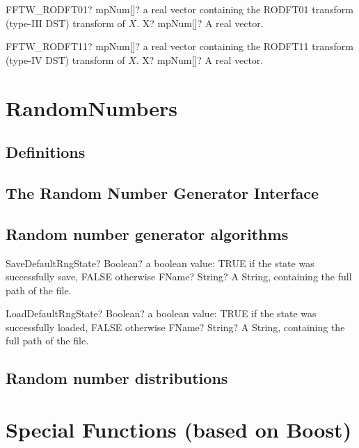 \documentclass[12pt,a4paper,openany]{book}
\begin{document}
\begin{mpFunctionsExtract}
\mpFunctionOne
{FFTW\_RODFT01? mpNum[]? a real vector containing the RODFT01 transform (type-III DST) transform of $X$.}
{X? mpNum[]? A real vector.}
\end{mpFunctionsExtract}

\begin{mpFunctionsExtract}
\mpFunctionOne
{FFTW\_RODFT11? mpNum[]? a real vector containing the RODFT11 transform (type-IV DST) transform of $X$.}
{X? mpNum[]? A real vector.}
\end{mpFunctionsExtract}

\chapter{RandomNumbers}

\section{Definitions}

\section{The Random Number Generator Interface}

\section{Random number generator algorithms}

\begin{mpFunctionsExtract}
\mpFunctionOne
{SaveDefaultRngState? Boolean? a boolean value: TRUE if the state was successfully save, FALSE otherwise}
{FName? String? A String, containing the full path of the file.}
\end{mpFunctionsExtract}

\begin{mpFunctionsExtract}
\mpFunctionOne
{LoadDefaultRngState? Boolean? a boolean value: TRUE if the state was successfully loaded, FALSE otherwise}
{FName? String? A String, containing the full path of the file.}
\end{mpFunctionsExtract}

\section{Random number distributions}

\chapter{Special Functions (based on Boost)}
\end{document}
